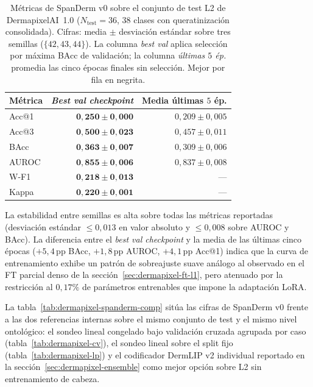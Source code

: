 \begin{table}[H]
\centering
\footnotesize
\setlength{\tabcolsep}{4pt}
\renewcommand{\arraystretch}{0.95}
\caption{Métricas de SpanDerm v0 sobre el conjunto de test L2 de
DermapixelAI~1.0 ($N_{\mathrm{test}} = 36$, $38$ clases con
queratinización consolidada). Cifras: media $\pm$ desviación
estándar sobre tres semillas ($\{42, 43, 44\}$). La columna
\emph{best val} aplica selección por máxima BAcc de validación;
la columna \emph{últimas $5$ ép.} promedia las cinco épocas
finales sin selección. Mejor por fila en negrita.}
\label{tab:dermapixel-spanderm-l2}
\begin{tabular}{lrr}
\hline
Métrica   & \emph{Best val \emph{checkpoint}} & Media últimas $5$ ép. \\
\hline
Acc@1     & $\mathbf{0{,}250 \pm 0{,}000}$ & $0{,}209 \pm 0{,}005$ \\
Acc@3     & $\mathbf{0{,}500 \pm 0{,}023}$ & $0{,}457 \pm 0{,}011$ \\
BAcc      & $\mathbf{0{,}363 \pm 0{,}007}$ & $0{,}309 \pm 0{,}006$ \\
AUROC     & $\mathbf{0{,}855 \pm 0{,}006}$ & $0{,}837 \pm 0{,}008$ \\
W-F1      & $\mathbf{0{,}218 \pm 0{,}013}$ & --- \\
Kappa     & $\mathbf{0{,}220 \pm 0{,}001}$ & --- \\
\hline
\end{tabular}
\end{table}

La estabilidad entre semillas es alta sobre todas las métricas
reportadas (desviación estándar $\leq 0{,}013$ en valor absoluto
y $\leq 0{,}008$ sobre AUROC y BAcc). La diferencia entre el
\emph{best val checkpoint} y la media de las últimas cinco épocas
($+5{,}4$\,pp BAcc, $+1{,}8$\,pp AUROC, $+4{,}1$\,pp Acc@1)
indica que la curva de entrenamiento exhibe un patrón de
sobreajuste suave análogo al observado en el FT parcial denso de
la secci\'on~\ref{sec:dermapixel-ft-l1}, pero atenuado por la
restricción al $0{,}17\%$ de parámetros entrenables que impone
la adaptación LoRA.

La tabla~\ref{tab:dermapixel-spanderm-comp} sitúa las cifras de
SpanDerm v0 frente a las dos referencias internas sobre el mismo
conjunto de test y el mismo nivel ontológico: el sondeo lineal
congelado bajo validación cruzada agrupada por caso
(tabla~\ref{tab:dermapixel-cv}), el sondeo lineal sobre el split
fijo (tabla~\ref{tab:dermapixel-lp}) y el codificador DermLIP v2
individual reportado en la secci\'on~\ref{sec:dermapixel-ensemble}
como mejor opción sobre L2 sin entrenamiento de cabeza.


